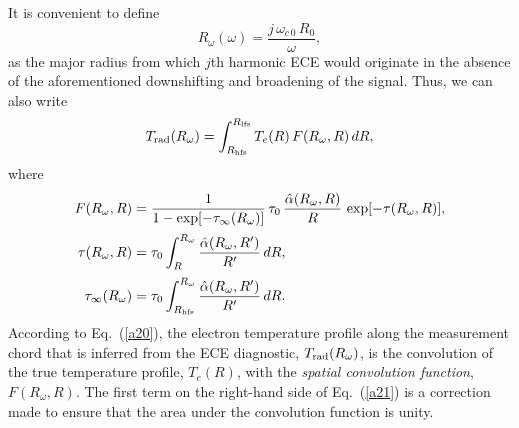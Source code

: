 \documentclass{iopjournal}
\begin{document}
{It is convenient to define
\begin{equation}
R_\omega(\omega) = \frac{j\,\omega_{c\,0}\,R_0}{\omega},
\end{equation}
as the major radius from which $j$th harmonic ECE would originate in the absence of the aforementioned downshifting and broadening of the signal. 
Thus, we can also write
\begin{equation}\label{a20}
T_{\rm rad}(R_\omega) = \int^{R_{\rm lfs}}_{R_{\rm hfs}}T_e(R)\,F(R_\omega,R)\,dR,
\end{equation}
where
\begin{align}\label{a21}
F(R_\omega,R) &= \frac{1}{1-\exp[-\tau_\infty(R_\omega)]}\,\tau_0\,\frac{\hat{\alpha}(R_\omega,R)}{R}\,\exp[-\tau(R_\omega, R)],\\[0.5ex]
\tau(R_\omega,R) &= \tau_0\int_R^{R_\omega}\frac{\hat{\alpha}(R_\omega,R')}{R'}\,dR,\\[0.5ex]
\tau_\infty(R_\omega) &= \tau_0\int^{R_\omega}_{R_{\rm hfs}}\frac{\hat{\alpha}(R_\omega,R')}{R'}\,dR.\label{tinf}
\end{align}
According to Eq.~(\ref{a20}), the electron temperature profile along the measurement chord that is inferred from the ECE diagnostic, $T_{\rm rad}(R_\omega)$,
is the convolution of the true temperature profile, $T_e(R)$, with the {\em spatial convolution function}, $F(R_\omega,R)$. The first term on the right-hand side of
Eq.~(\ref{a21}) is a correction made to ensure that the area under the convolution function is unity. 

}
\end{document}
